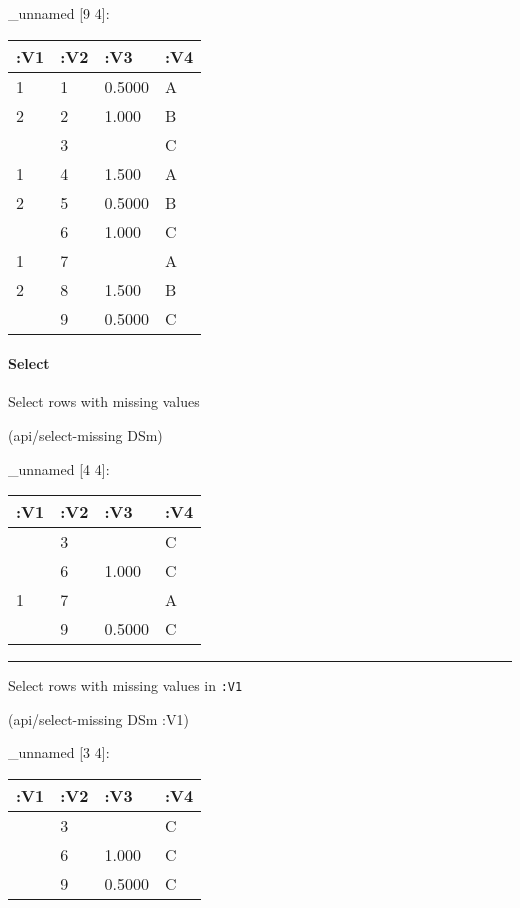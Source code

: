 \documentclass[]{article}
\newenvironment{Shaded}{\begin{snugshade}}{\end{snugshade}}
\newcommand{\AttributeTok}[1]{\textcolor[rgb]{0.77,0.63,0.00}{#1}}
\newcommand{\NormalTok}[1]{#1}
\let\oldparagraph\paragraph
\renewcommand{\paragraph}[1]{\oldparagraph{#1}\mbox{}}
\begin{document}
\_unnamed {[}9 4{]}:

\begin{longtable}[]{@{}llll@{}}
\toprule
:V1 & :V2 & :V3 & :V4\tabularnewline
\midrule
\endhead
1 & 1 & 0.5000 & A\tabularnewline
2 & 2 & 1.000 & B\tabularnewline
& 3 & & C\tabularnewline
1 & 4 & 1.500 & A\tabularnewline
2 & 5 & 0.5000 & B\tabularnewline
& 6 & 1.000 & C\tabularnewline
1 & 7 & & A\tabularnewline
2 & 8 & 1.500 & B\tabularnewline
& 9 & 0.5000 & C\tabularnewline
\bottomrule
\end{longtable}

\paragraph{Select}\label{select-2}

Select rows with missing values

\begin{Shaded}
\begin{Highlighting}[]
\NormalTok{(api/select-missing DSm)}
\end{Highlighting}
\end{Shaded}

\_unnamed {[}4 4{]}:

\begin{longtable}[]{@{}llll@{}}
\toprule
:V1 & :V2 & :V3 & :V4\tabularnewline
\midrule
\endhead
& 3 & & C\tabularnewline
& 6 & 1.000 & C\tabularnewline
1 & 7 & & A\tabularnewline
& 9 & 0.5000 & C\tabularnewline
\bottomrule
\end{longtable}

\begin{center}\rule{0.5\linewidth}{0.5pt}\end{center}

Select rows with missing values in \texttt{:V1}

\begin{Shaded}
\begin{Highlighting}[]
\NormalTok{(api/select-missing DSm }\AttributeTok{:V1}\NormalTok{)}
\end{Highlighting}
\end{Shaded}

\_unnamed {[}3 4{]}:

\begin{longtable}[]{@{}llll@{}}
\toprule
:V1 & :V2 & :V3 & :V4\tabularnewline
\midrule
\endhead
& 3 & & C\tabularnewline
& 6 & 1.000 & C\tabularnewline
& 9 & 0.5000 & C\tabularnewline
\bottomrule
\end{longtable}
\end{document}
